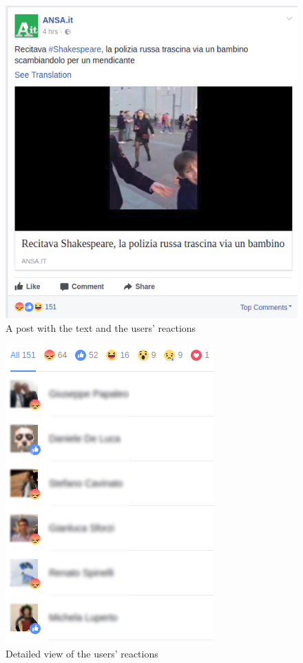 \documentclass[article,11pt,nofixltx2e]{article}
\begin{document}
\begin{figure}[htb]
\centering
\includegraphics[width=.9\linewidth]{./img/sample1.png}
\caption{\label{fig:sample1}A post with the text and the users' reactions}
\end{figure}

\begin{figure}[htb]
\centering
\includegraphics[width=.9\linewidth]{./img/sample2.png}
\caption{\label{fig:sample2}Detailed view of the users' reactions}
\end{figure}
\end{document}
